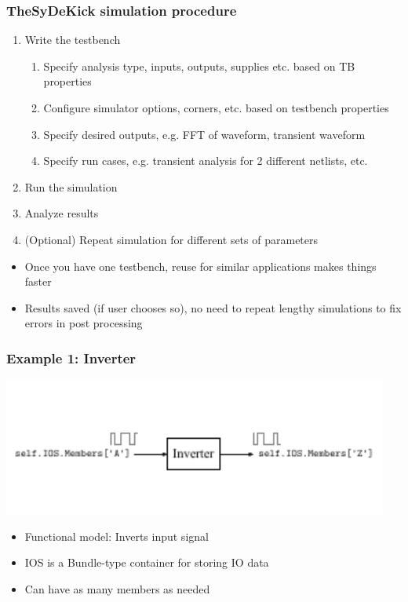 \documentclass[logo=bluequo,normaltitle]{aaltoslides}
\newcommand{\sectname}{Section Name}
\begin{document}
\renewcommand{\sectname}{TheSyDeKick simulation procedure}
\begin{frame}[t]
    \frametitle{\sectname}
        \begin{enumerate}
            \item Write the testbench
            \begin{enumerate}
                \item Specify analysis type, inputs, outputs, supplies etc. based on TB properties
                \item Configure simulator options, corners, etc. based on
                    testbench properties
                \item Specify desired outputs, e.g. FFT of waveform, transient waveform
                \item Specify run cases, e.g. transient analysis for 2 different netlists, etc.
            \end{enumerate}
            \item Run the simulation
            \item Analyze results
            \item (Optional) Repeat simulation for different sets of parameters
        \end{enumerate}
        \begin{itemize}
            \item Once you have one testbench, reuse for similar applications makes things faster
            \item Results saved (if user chooses so), no need to repeat lengthy simulations to fix errors in post processing
        \end{itemize}
\end{frame}



\renewcommand{\sectname}{Example 1: Inverter}
\begin{frame}[t]
    \frametitle{\sectname}
    \centering
    \includegraphics[width=0.95\textwidth]{Pics/inverter_single_1}
    \begin{itemize}
        \item Functional model: Inverts input signal
        \item IOS is a Bundle-type container for storing IO data
        \item Can have as many members as needed
    \end{itemize}
\end{frame}
\end{document}
